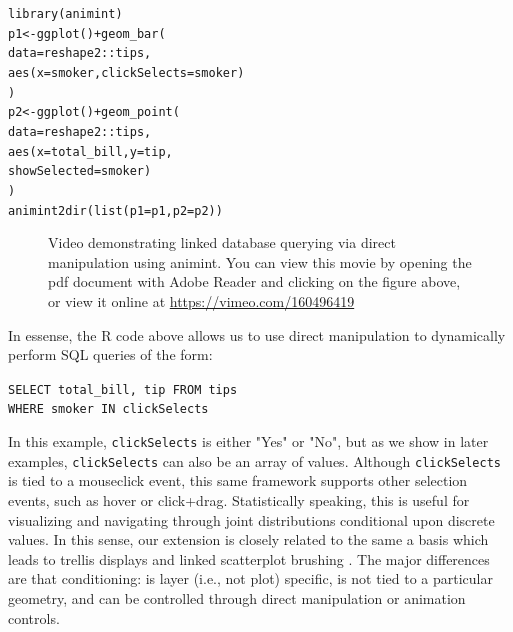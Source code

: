 \documentclass[12pt]{article}\usepackage[]{graphicx}\usepackage[]{color}
\makeatletter
\newcommand{\hlopt}[1]{\textcolor[rgb]{0,0,0}{#1}}%
\newcommand{\hlstd}[1]{\textcolor[rgb]{0,0,0}{#1}}%
\newcommand{\hlkwb}[1]{\textcolor[rgb]{0,0,0}{#1}}%
\newcommand{\hlkwc}[1]{\textcolor[rgb]{0,0,1}{#1}}%
\newcommand{\hlkwd}[1]{\textcolor[rgb]{0,0,0}{#1}}%
\newenvironment{kframe}{%
 \def\at@end@of@kframe{}%
 \ifinner\ifhmode%
  \def\at@end@of@kframe{\end{minipage}}%
  \begin{minipage}{\columnwidth}%
 \fi\fi%
 \def\FrameCommand##1{\hskip\@totalleftmargin \hskip-\fboxsep
 \colorbox{shadecolor}{##1}\hskip-\fboxsep
     \hskip-\linewidth \hskip-\@totalleftmargin \hskip\columnwidth}%
 \MakeFramed {\advance\hsize-\width
   \@totalleftmargin\z@ \linewidth\hsize
   \@setminipage}}%
 {\par\unskip\endMakeFramed%
 \at@end@of@kframe}
\newenvironment{knitrout}{}{} %
\makeatother
\begin{document}
\begin{knitrout}
\color{fgcolor}\begin{kframe}
\begin{alltt}
\hlkwd{library}\hlstd{(animint)}
\hlstd{p1} \hlkwb{<-} \hlkwd{ggplot}\hlstd{()} \hlopt{+} \hlkwd{geom_bar}\hlstd{(}
  \hlkwc{data} \hlstd{= reshape2}\hlopt{::}\hlstd{tips,}
  \hlkwd{aes}\hlstd{(}\hlkwc{x} \hlstd{= smoker,} \hlkwc{clickSelects} \hlstd{= smoker)}
\hlstd{)}
\hlstd{p2} \hlkwb{<-} \hlkwd{ggplot}\hlstd{()} \hlopt{+} \hlkwd{geom_point}\hlstd{(}
  \hlkwc{data} \hlstd{= reshape2}\hlopt{::}\hlstd{tips,}
  \hlkwd{aes}\hlstd{(}\hlkwc{x} \hlstd{= total_bill,} \hlkwc{y} \hlstd{= tip,}
      \hlkwc{showSelected} \hlstd{= smoker)}
\hlstd{)}
\hlkwd{animint2dir}\hlstd{(}\hlkwd{list}\hlstd{(}\hlkwc{p1} \hlstd{= p1,} \hlkwc{p2} \hlstd{= p2))}
\end{alltt}
\end{kframe}
\end{knitrout}

\begin{figure}[htp]
	\centerline{}
	\label{fig:tips}
	\caption{Video demonstrating linked database querying via direct manipulation using animint. You can view this movie by opening the pdf document with Adobe Reader and clicking on the figure above, or view it online at \url{https://vimeo.com/160496419}}
\end{figure}

In essense, the R code above allows us to use direct manipulation to dynamically
perform SQL queries of the form:

\vspace{0.3cm}
\texttt{SELECT total\_bill, tip FROM tips} \\
\hspace*{1cm} \texttt{WHERE smoker IN clickSelects}
\vspace{0.3cm}

In this example, \texttt{clickSelects} is either "Yes" or "No", but as we show 
in later examples, \texttt{clickSelects} can also be an array of values. 
Although \texttt{clickSelects} is tied to a mouseclick event, this same 
framework supports other selection events, such as hover or click+drag. 
Statistically speaking, this is useful for visualizing and navigating through 
joint distributions conditional upon discrete values. In this sense, our 
extension is closely related to the same a basis which leads to trellis 
displays \citep{trellis} and linked scatterplot brushing 
\citep{brushing-scatterplots}. The major differences are that conditioning: 
is layer (i.e., not plot) specific, is not tied to a particular geometry, and 
can be controlled through direct manipulation or animation controls.
\end{document}
